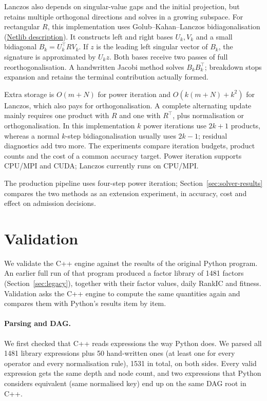 \documentclass[11pt,a4paper]{article}
\begin{document}
Lanczos also depends on singular-value gaps and the initial projection, but retains multiple orthogonal directions and solves in a growing subspace. For rectangular $R$, this implementation uses Golub--Kahan--Lanczos bidiagonalisation (\href{https://netlib.org/utk/people/JackDongarra/etemplates/node197.html}{Netlib description}). It constructs left and right bases $U_k,V_k$ and a small bidiagonal $B_k=U_k^\top RV_k$. If $z$ is the leading left singular vector of $B_k$, the signature is approximated by $U_kz$. Both bases receive two passes of full reorthogonalisation. A handwritten Jacobi method solves $B_kB_k^\top$; breakdown stops expansion and retains the terminal contribution actually formed.

Extra storage is $O(m+N)$ for power iteration and $O(k(m+N)+k^2)$ for Lanczos, which also pays for orthogonalisation. A complete alternating update mainly requires one product with $R$ and one with $R^\top$, plus normalisation or orthogonalisation. In this implementation $k$ power iterations use $2k+1$ products, whereas a normal $k$-step bidiagonalisation usually uses $2k-1$; residual diagnostics add two more. The experiments compare iteration budgets, product counts and the cost of a common accuracy target. Power iteration supports CPU/MPI and CUDA; Lanczos currently runs on CPU/MPI.

The production pipeline uses four-step power iteration; Section~\ref{sec:solver-results} compares the two methods as an extension experiment, in accuracy, cost and effect on admission decisions.

\section{Validation}
\label{sec:validation}
We validate the C++ engine against the results of the original Python program. An earlier full run of that program produced a factor library of 1481 factors (Section~\ref{sec:legacy}), together with their factor values, daily RankIC and fitness. Validation asks the C++ engine to compute the same quantities again and compares them with Python's results item by item.

\paragraph{Parsing and DAG.} We first checked that C++ reads expressions the way Python does. We parsed all 1481 library expressions plus 50 hand-written ones (at least one for every operator and every normalisation rule), 1531 in total, on both sides. Every valid expression gets the same depth and node count, and two expressions that Python considers equivalent (same normalised key) end up on the same DAG root in C++.
\end{document}
